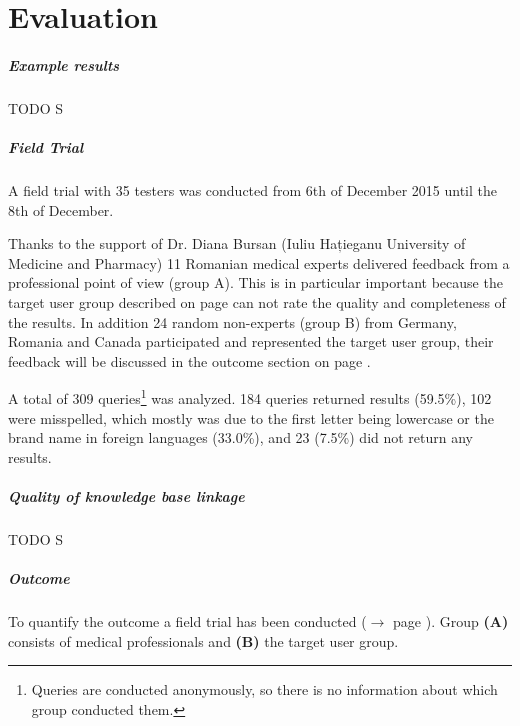 \documentclass[11pt,titlepage,oneside,openany]{book}
\begin{document}
\chapter{Evaluation}
\label{cha:evaluation}

\paragraph{Example results}
\label{cha:example}

TODO S

\paragraph{Field Trial}
\label{cha:field_trial}
A field trial with 35 testers was conducted from 6th of December 2015 until the 8th of December.

Thanks to the support of Dr. Diana Bursan (Iuliu Hațieganu University of Medicine and Pharmacy) 11 Romanian medical experts delivered feedback from a professional point of view (group A). This is in particular important because the target user group described on page \pageref{cha:domain} can not rate the quality and completeness of the results.
In addition 24 random non-experts (group B) from Germany, Romania and Canada participated and represented the target user group, their feedback will be discussed in the outcome section on page \pageref{outcome}. 

A total of 309 queries\footnote{Queries are conducted anonymously, so there is no information about which group conducted them.} was analyzed. 184 queries returned results (59.5\%), 102 were misspelled, which mostly was due to the first letter being lowercase or the brand name in foreign languages (33.0\%), and 23 (7.5\%) did not return any results.  

\paragraph{Quality of knowledge base linkage}
\label{cha:example}

TODO S

\paragraph{Outcome}
\label{outcome}
To quantify the outcome a field trial has been conducted ($\rightarrow$ page \pageref{cha:field_trial}). Group \textbf{(A)} consists of medical professionals and \textbf{(B)} the target user group.
\end{document}
